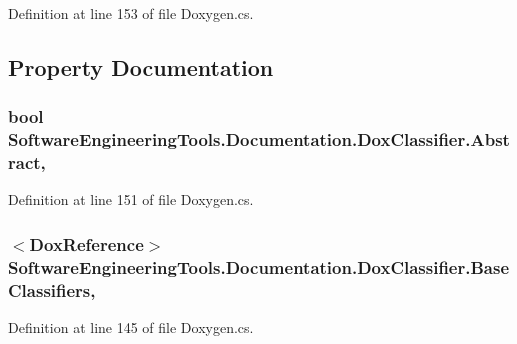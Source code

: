 Definition at line 153 of file Doxygen.\+cs.



\subsection{Property Documentation}
\hypertarget{class_software_engineering_tools_1_1_documentation_1_1_dox_classifier_aa8ae1560fc7385af43a9af53bf6fdd0d}{
\subsubsection[{Abstract}]{\setlength{\rightskip}{0pt plus 5cm}bool Software\+Engineering\+Tools.\+Documentation.\+Dox\+Classifier.\+Abstract\hspace{0.3cm}{\ttfamily [get]}, {\ttfamily [set]}}}\label{class_software_engineering_tools_1_1_documentation_1_1_dox_classifier_aa8ae1560fc7385af43a9af53bf6fdd0d}


Definition at line 151 of file Doxygen.\+cs.

\hypertarget{class_software_engineering_tools_1_1_documentation_1_1_dox_classifier_a90983bfa6218a20b61bd00d1a01a1da4}{
\subsubsection[{Base\+Classifiers}]{$<${\bf Dox\+Reference}$>$ Software\+Engineering\+Tools.\+Documentation.\+Dox\+Classifier.\+Base\+Classifiers\hspace{0.3cm}{\ttfamily [get]}, {\ttfamily [set]}}}\label{class_software_engineering_tools_1_1_documentation_1_1_dox_classifier_a90983bfa6218a20b61bd00d1a01a1da4}


Definition at line 145 of file Doxygen.\+cs.

